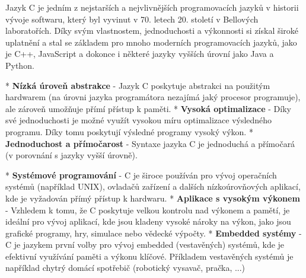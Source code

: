 Jazyk C je jedním z nejstarších a nejvlivnějších programovacích jazyků v historii vývoje softwaru, který byl vyvinut v 70. letech 20. století v Bellových laboratořích. Díky svým vlastnostem, jednoduchosti a výkonnosti si získal široké uplatnění a stal se základem pro mnoho moderních programovacích jazyků, jako je C++, JavaScript a dokonce i některé jazyky vyšších úrovní jako Java a Python. 

\begitems
* {\bf Nízká úroveň abstrakce} - Jazyk C poskytuje abstrakci na použitým hardwarem (na úrovni jazyka programátora nezajímá jaký procesor programuje), ale zároveň umožňuje přímí přístup k paměti. 
* {\bf Vysoká optimalizace} - Díky své jednoduchosti je možné využít vysokou míru optimalizace výsledného programu. Díky tomu poskytují výsledné programy vysoký výkon.
* {\bf Jednoduchost a přímočarost} - Syntaxe jazyka C je jednoduchá a přímočará (v porovnání s jazyky vyšší úrovně). 
\enditems

\begitems
* {\bf Systémové programování} -  C je široce používán pro vývoj operačních systémů (například UNIX), ovladačů zařízení a dalších nízkoúrovňových aplikací, kde je vyžadován přímý přístup k hardwaru.
* {\bf Aplikace s vysokým výkonem} - Vzhledem k tomu, že C poskytuje velkou kontrolu nad výkonem a pamětí, je ideální pro vývoj aplikací, kde jsou kladeny vysoké nároky na výkon, jako jsou grafické programy, hry, simulace nebo vědecké výpočty.
* {\bf Embedded systémy} - C je jazykem první volby pro vývoj embedded (vestavěných) systémů, kde je efektivní využívání paměti a výkonu klíčové. Příkladem vestavěných systémů je například chytrý domácí spotřebič (robotický vysavač, pračka, ...)
\enditems

